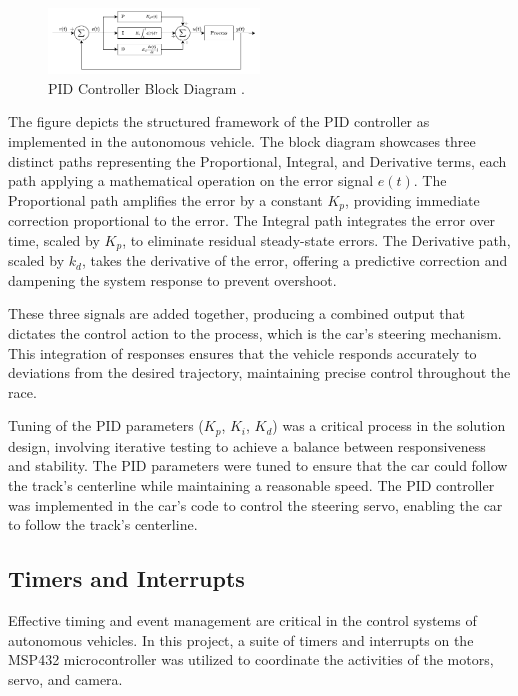 \documentclass[conference]{IEEEtran}
\begin{document}
\begin{figure}[htbp]
	\centerline{\includegraphics[width=0.5\textwidth]{images/pid.png}}
	\caption{PID Controller Block Diagram \cite{controlSystems}.}
	\label{fig:PID}
\end{figure}

The figure depicts the structured framework of the PID controller as implemented in the autonomous vehicle. The block diagram showcases three distinct paths representing the Proportional, Integral, and Derivative terms, each path applying a mathematical operation on the error signal $e(t)$. The Proportional path amplifies the error by a constant $K_p$, providing immediate correction proportional to the error. The Integral path integrates the error over time, scaled by $K_p$, to eliminate residual steady-state errors. The Derivative path, scaled by $k_d$, takes the derivative of the error, offering a predictive correction and dampening the system response to prevent overshoot.

These three signals are added together, producing a combined output that dictates the control action to the process, which is the car's steering mechanism. This integration of responses ensures that the vehicle responds accurately to deviations from the desired trajectory, maintaining precise control throughout the race.

Tuning of the PID parameters ($K_p$, $K_i$, $K_d$) was a critical process in the solution design, involving iterative testing to achieve a balance between responsiveness and stability. The PID parameters were tuned to ensure that the car could follow the track's centerline while maintaining a reasonable speed. The PID controller was implemented in the car's code to control the steering servo, enabling the car to follow the track's centerline.

\subsection{Timers and Interrupts}

Effective timing and event management are critical in the control systems of autonomous vehicles. In this project, a suite of timers and interrupts on the MSP432 microcontroller was utilized to coordinate the activities of the motors, servo, and camera.
\end{document}
